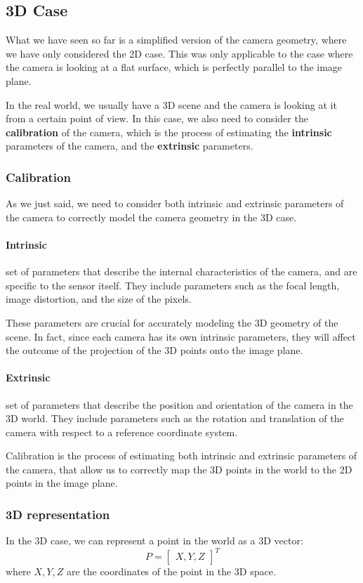 \subsection{3D Case}
What we have seen so far is a simplified version of the camera geometry, where we have only considered the 2D case.
This was only applicable to the case where the camera is looking at a flat surface, which is perfectly parallel to the image plane. 

In the real world, we usually have a 3D scene and the camera is looking at it from a certain point of view. In this case, we also need to consider
the \textbf{calibration} of the camera, which is the process of estimating the \textbf{intrinsic} parameters of the camera, and the \textbf{extrinsic} parameters.

\subsubsection{Calibration}
As we just said, we need to consider both intrinsic and extrinsic parameters of the camera to correctly model the camera geometry in the 3D case.

\paragraph{Intrinsic} set of parameters that describe the internal characteristics of the camera, and are specific to the sensor itself.
They include parameters such as the focal length, image distortion, and the size of the pixels.

These parameters are crucial for accurately modeling the 3D geometry of the scene. In fact, since each camera has its own intrinsic parameters,
they will affect the outcome of the projection of the 3D points onto the image plane.

\paragraph{Extrinsic} set of parameters that describe the position and orientation of the camera in the 3D world. 
They include parameters such as the rotation and translation of the camera with respect to a reference coordinate system.

Calibration is the process of estimating both intrinsic and extrinsic parameters of the camera, that allow us to correctly
map the 3D points in the world to the 2D points in the image plane.

\subsubsection{3D representation}
In the 3D case, we can represent a point in the world as a 3D vector:
\[ P = \begin{bmatrix} X, Y, Z \end{bmatrix}^T \]
where \( X, Y, Z \) are the coordinates of the point in the 3D space.


